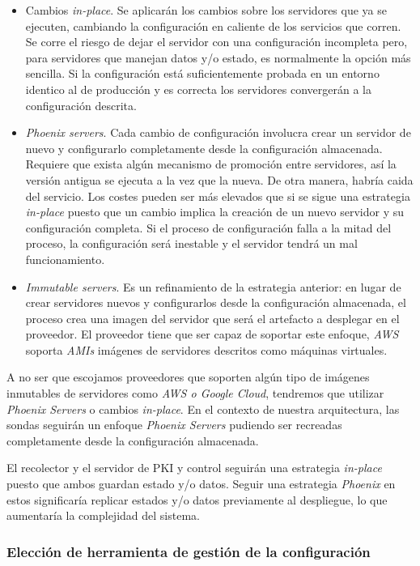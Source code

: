 \begin{itemize}
    \item Cambios \emph{in-place}. Se aplicarán los cambios sobre los servidores que ya se ejecuten, cambiando la configuración en caliente de los servicios que corren.
    Se corre el riesgo de dejar el servidor con una configuración incompleta pero, para servidores que manejan datos y/o estado, es normalmente la opción más sencilla. Si la configuración
    está suficientemente probada en un entorno identico al de producción y es correcta los servidores convergerán a la configuración descrita. 
    \item \emph{Phoenix servers}. Cada cambio de configuración involucra crear un servidor de nuevo y configurarlo completamente desde la configuración almacenada.
    Requiere que exista algún mecanismo de promoción entre servidores, así la versión antigua se ejecuta a la vez que la nueva. De otra manera, habría caida del servicio. Los costes pueden ser más elevados que si se sigue una estrategia \emph{in-place}
    puesto que un cambio implica la creación de un nuevo servidor y su configuración completa. Si el proceso de configuración falla a la mitad del proceso, la configuración será inestable y el servidor tendrá un mal funcionamiento.
    \item \emph{Immutable servers}. Es un refinamiento de la estrategia anterior: en lugar de crear servidores nuevos y configurarlos desde la configuración almacenada, el proceso crea una imagen del servidor que será el artefacto a desplegar en el proveedor.
    El proveedor tiene que ser capaz de soportar este enfoque, \emph{AWS} soporta \emph{AMIs} imágenes de servidores descritos como máquinas virtuales.  
\end{itemize}

A no ser que escojamos proveedores que soporten algún tipo de imágenes inmutables de servidores como \emph{AWS o Google Cloud}, tendremos que utilizar \emph{Phoenix Servers} o cambios \emph{in-place}.
En el contexto de nuestra arquitectura, las sondas seguirán un enfoque \emph{Phoenix Servers} pudiendo ser recreadas completamente desde la configuración almacenada.

El recolector y el servidor de PKI y control seguirán una estrategia \emph{in-place} puesto que ambos guardan estado y/o datos. Seguir una estrategia \emph{Phoenix} en estos
significaría replicar estados y/o datos previamente al despliegue, lo que aumentaría la complejidad del sistema.

\subsubsection{Elección de herramienta de gestión de la configuración}

